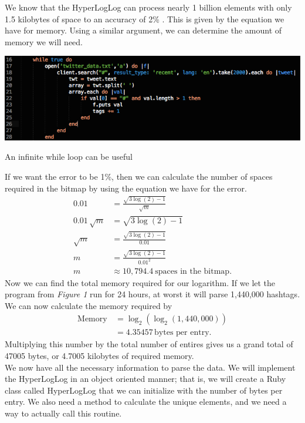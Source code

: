 \documentclass{article}
\begin{document}
We know that the HyperLogLog can process nearly 1 billion elements with only 1.5 kilobytes of space to an accuracy of 2\% \cite{Flaj}.
This is given by the equation we have for memory.
Using a similar argument, we can determine the amount of memory we will need.
\begin{floatingfigure}[hr]{8cm}
\centering
\begin{framed}
\includegraphics[scale=0.3]{twitter_problem/ruby_code_01}
\caption{An infinite while loop can be useful}
\end{framed}
\end{floatingfigure}
\noindent If we want the error to be 1\%, then we can calculate the number of spaces required in the bitmap by using the equation we have for the error.
\begin{align*}
0.01 &= \frac{\sqrt{3\log{(2)} - 1}}{\sqrt{m}}\\
0.01\,\sqrt{m} &= \sqrt{3\log{(2)} - 1}\\
\sqrt{m}\, &= \frac{\sqrt{3\log{(2)} - 1}}{0.01}\\
m &= \frac{\sqrt{3\log{(2)} - 1}}{0.01^{2}}\\
m &\approx 10,794.4\ \text{spaces in the bitmap}.
\end{align*}
Now we can find the total memory required for our logarithm. If we let the program from \textit{Figure 1} run for 24 hours, at worst it will parse 1,440,000 hashtags.
We can now calculate the memory required by
\begin{align*}
\text{Memory}\, &= \log_{2}{(\log_{2}{(1,440,000)})}\\
&= 4.35457 \, \text{bytes per entry}.
\end{align*}
Multiplying this number by the total number of entires gives us a grand total of 47005 bytes, or 4.7005 kilobytes of required memory.\\
\indent We now have all the necessary information to parse the data. We will implement the HyperLogLog in an object oriented manner; that is, we will create a Ruby class called HyperLogLog that we can initialize with the number of bytes per entry.
We also need a method to calculate the unique elements, and we need a way to actually call this routine.
\end{document}

